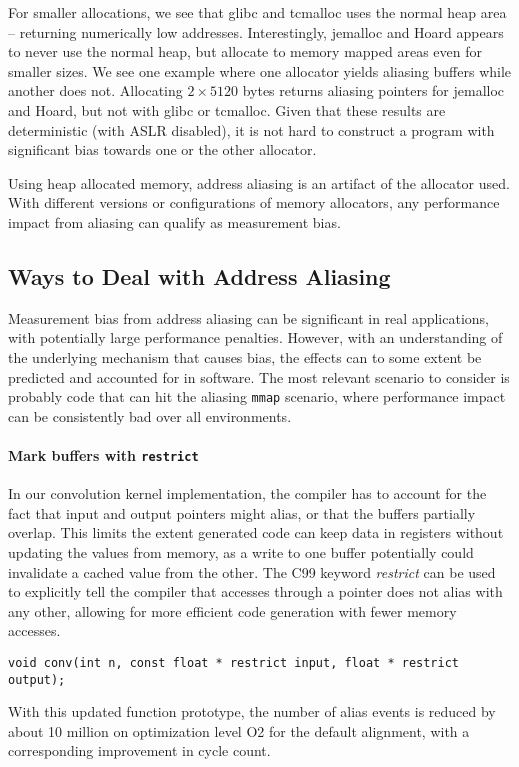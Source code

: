 \documentclass[a4paper,10pt,twocolumn,twoside]{article}
\begin{document}
{For smaller allocations, we see that glibc and tcmalloc uses the normal heap area -- returning numerically low addresses.
Interestingly, jemalloc and Hoard appears to never use the normal heap, but allocate to memory mapped areas even for smaller sizes.
We see one example where one allocator yields aliasing buffers while another does not.
Allocating $2 \times 5120$ bytes returns aliasing pointers for jemalloc and Hoard, but not with glibc or tcmalloc.
Given that these results are deterministic (with ASLR disabled), it is not hard to construct a program with significant bias towards one or the other allocator.

Using heap allocated memory, address aliasing is an artifact of the allocator used.
With different versions or configurations of memory allocators, any performance impact from aliasing can qualify as measurement bias.




\subsection{Ways to Deal with Address Aliasing}
Measurement bias from address aliasing can be significant in real applications, with potentially large performance penalties.
However, with an understanding of the underlying mechanism that causes bias, the effects can to some extent be predicted and accounted for in software.
The most relevant scenario to consider is probably code that can hit the aliasing \texttt{mmap} scenario, where performance impact can be consistently bad over all environments.

\paragraph{Mark buffers with \texttt{restrict}}
In our convolution kernel implementation, the compiler has to account for the fact that input and output pointers might alias, or that the buffers partially overlap.
This limits the extent generated code can keep data in registers without updating the values from memory, as a write to one buffer potentially could invalidate a cached value from the other.
The C99 keyword \emph{restrict} can be used to explicitly tell the compiler that accesses through a pointer does not alias with any other, allowing for more efficient code generation with fewer memory accesses.
\begin{lstlisting}[breaklines=true]
    void conv(int n, const float * restrict input, float * restrict output);
\end{lstlisting}
With this updated function prototype, the number of alias events is reduced by about 10 million on optimization level O2 for the default alignment, with a corresponding improvement in cycle count. %

}
\end{document}
